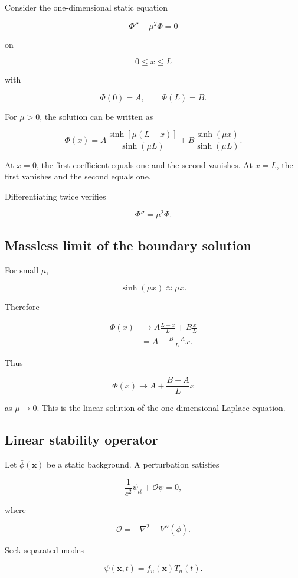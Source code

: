 Consider the one-dimensional static equation

\[
\Phi''-\mu^{2}\Phi=0
\]

on

\[
0\leq x\leq L
\]

with

\[
\Phi(0)=A,
\qquad
\Phi(L)=B.
\]

For \(\mu>0\), the solution can be written as

\[
\boxed{
\Phi(x)
=
A
\frac{
\sinh[\mu(L-x)]
}{
\sinh(\mu L)
}
+
B
\frac{
\sinh(\mu x)
}{
\sinh(\mu L)
}
}.
\]

At \(x=0\), the first coefficient equals one and the second vanishes. At \(x=L\), the first vanishes and the second equals one.

Differentiating twice verifies

\[
\Phi''=\mu^{2}\Phi.
\]

\subsection{Massless limit of the boundary solution}

For small \(\mu\),

\[
\sinh(\mu x)
\approx
\mu x.
\]

Therefore

\[
\begin{aligned}
\Phi(x)
&\longrightarrow
A
\frac{L-x}{L}
+
B
\frac{x}{L}\\
&=
A+
\frac{B-A}{L}x.
\end{aligned}
\]

Thus

\[
\boxed{
\Phi(x)
\longrightarrow
A+
\frac{B-A}{L}x
}
\]

as \(\mu\to0\). This is the linear solution of the one-dimensional Laplace equation.

\subsection{Linear stability operator}

Let \(\bar\phi(\mathbf{x})\) be a static background. A perturbation satisfies

\[
\frac{1}{c^{2}}\psi_{tt}
+
\mathcal{O}\psi
=0,
\]

where

\[
\boxed{
\mathcal{O}
=
-\nabla^{2}
+
V''(\bar\phi)
}.
\]

Seek separated modes

\[
\psi(\mathbf{x},t)
=
f_{n}(\mathbf{x})T_{n}(t).
\]


